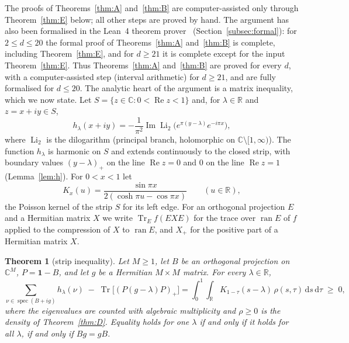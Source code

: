 \documentclass[11pt]{amsart}
\newtheorem{introthm}{Theorem}
\theoremstyle{definition}
\theoremstyle{remark}
\numberwithin{equation}{section}
\newcommand{\R}{\mathbb{R}}
\newcommand{\C}{\mathbb{C}}
\newcommand{\Tr}{\operatorname{Tr}}
\newcommand{\spec}{\operatorname{spec}}
\renewcommand{\Re}{\operatorname{Re}}
\renewcommand{\Im}{\operatorname{Im}}
\newcommand{\Li}{\operatorname{Li}_2}
\newcommand{\one}{\mathbf{1}}
\newcommand{\dd}{\,\mathrm{d}}
\begin{document}
The proofs of Theorems~\ref{thm:A} and~\ref{thm:B} are computer-assisted only through Theorem~\ref{thm:E} below; all
other steps are proved by hand. The argument has also been formalised in the Lean~4 theorem prover~\cite{Lean,Mathlib}
(Section~\ref{subsec:formal}): for $2\le d\le20$ the formal proof of Theorems~\ref{thm:A} and~\ref{thm:B} is complete,
including Theorem~\ref{thm:E}, and for $d\ge21$ it is complete except for the input Theorem~\ref{thm:E}. Thus
Theorems~\ref{thm:A} and~\ref{thm:B} are proved for every $d$, with a computer-assisted step (interval arithmetic) for
$d\ge21$, and are fully formalised for $d\le20$. The analytic heart of the argument is a matrix inequality, which we
now state. Let
$S=\{z\in\C:0<\Re z<1\}$ and, for $\lambda\in\R$ and $z=x+iy\in S$,
\begin{equation}\label{eq:hlambda}
h_\lambda(x+iy)=-\frac1{\pi^2}\Im\Li\bigl(e^{\pi(y-\lambda)}e^{-i\pi x}\bigr),
\end{equation}
where $\Li$ is the dilogarithm (principal branch, holomorphic on $\C\setminus[1,\infty)$). The function
$h_\lambda$ is harmonic on $S$ and extends continuously to the closed strip, with boundary values $(y-\lambda)_+$
on the line $\Re z=0$ and $0$ on the line $\Re z=1$ (Lemma~\ref{lem:h}). For $0<x<1$ let
\begin{equation}\label{eq:poisson}
K_x(u)=\frac{\sin\pi x}{2(\cosh\pi u-\cos\pi x)}\qquad(u\in\R),
\end{equation}
the Poisson kernel of the strip $S$ for its left edge. For an orthogonal projection $E$ and a Hermitian matrix $X$
we write $\Tr_E f(EXE)$ for the trace over $\operatorname{ran}E$ of $f$ applied to the compression of $X$ to
$\operatorname{ran}E$, and $X_+$ for the positive part of a Hermitian matrix $X$.

\begin{introthm}[strip inequality]\label{thm:C}
Let $M\ge1$, let $B$ be an orthogonal projection on $\C^M$, $P=\one-B$, and let $g$ be a Hermitian $M\times M$
matrix. For every $\lambda\in\R$,
\begin{equation}\label{eq:star}
\sum_{\nu\in\spec(B+ig)}h_\lambda(\nu)\;-\;\Tr\bigl[(P(g-\lambda)P)_+\bigr]
=\int_0^1\!\!\int_\R K_{1-\tau}(s-\lambda)\,\rho(s,\tau)\dd s\dd\tau\;\ge\;0,
\end{equation}
where the eigenvalues are counted with algebraic multiplicity and $\rho\ge0$ is the density of
Theorem~\ref{thm:D}. Equality holds for one $\lambda$ if and only if it holds for all $\lambda$, if and only if
$Bg=gB$.
\end{introthm}
\end{document}
